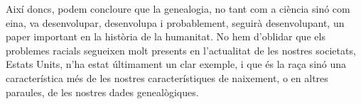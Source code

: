     Així doncs, podem concloure que la genealogia, no tant com a ciència sinó com eina, va desenvolupar, desenvolupa i probablement, seguirà desenvolupant, un paper important en la història de la humanitat. No hem d’oblidar que els problemes racials segueixen molt presents en l'actualitat de les nostres societats, Estats Units, n'ha estat últimament un clar exemple, i que és la raça sinó una característica més de les nostres característiques de naixement, o en altres paraules, de les nostres dades genealògiques.

